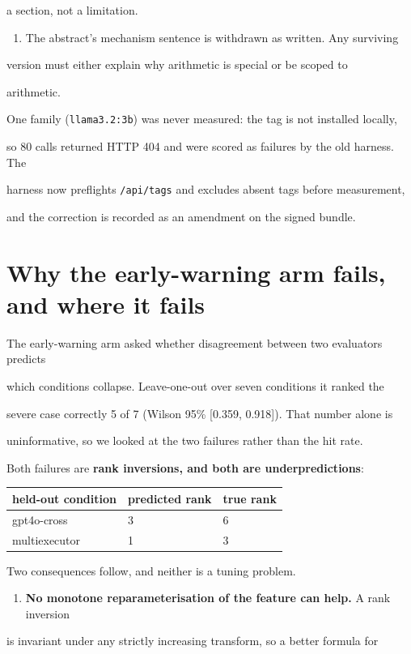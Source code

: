 \documentclass[11pt]{article}
\begin{document}
a section, not a limitation.

\begin{enumerate}\item The abstract's mechanism sentence is withdrawn as written. Any surviving
\end{enumerate}
version must either explain why arithmetic is special or be scoped to

arithmetic.


One family (\texttt{llama3.2:3b}) was never measured: the tag is not installed locally,

so 80 calls returned HTTP 404 and were scored as failures by the old harness. The

harness now preflights \texttt{/api/tags} and excludes absent tags before measurement,

and the correction is recorded as an amendment on the signed bundle.


\section*{Why the early-warning arm fails, and where it fails}

The early-warning arm asked whether disagreement between two evaluators predicts

which conditions collapse. Leave-one-out over seven conditions it ranked the

severe case correctly 5 of 7 (Wilson 95\% [0.359, 0.918]). That number alone is

uninformative, so we looked at the two failures rather than the hit rate.


Both failures are {\bf rank inversions, and both are underpredictions}:


\begin{center}\small\begin{tabular}{lll}\hline
held-out condition & predicted rank & true rank \\
\hline
gpt4o-cross & 3 & 6 \\
multiexecutor & 1 & 3 \\
\end{tabular}\end{center}

Two consequences follow, and neither is a tuning problem.


\begin{enumerate}\item {\bf No monotone reparameterisation of the feature can help.} A rank inversion
\end{enumerate}
is invariant under any strictly increasing transform, so a better formula for
\end{document}
